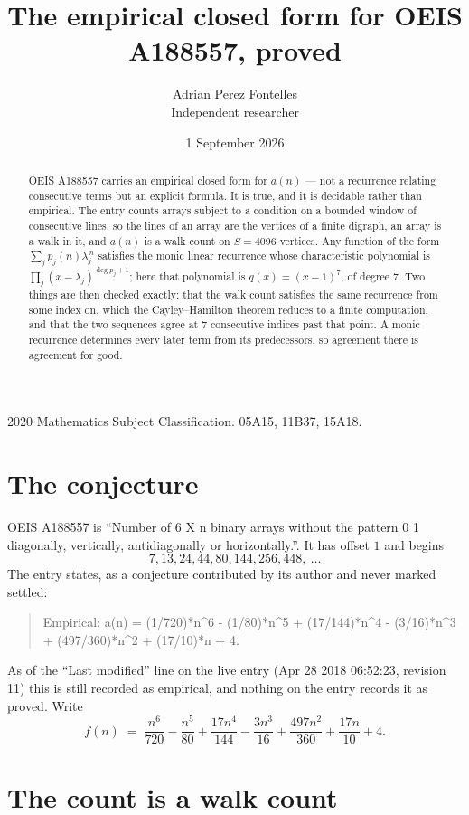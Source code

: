 \documentclass[11pt,a4paper]{article}
\title{The empirical closed form for OEIS A188557, proved}
\author{Adrian Perez Fontelles\\ \small Independent researcher}
\date{1 September 2026}
\theoremstyle{plain}
\theoremstyle{definition}
\begin{document}
\maketitle

\begin{abstract}
OEIS A188557 carries an empirical closed form for $a(n)$ --- not a recurrence relating
consecutive terms but an explicit formula. It is true, and it is decidable rather than
empirical. The entry counts arrays subject to a condition on a bounded window of consecutive lines, so the lines of an array are the
vertices of a finite digraph, an array is a walk in it, and $a(n)$ is a walk count on
$S=4096$ vertices. Any function of the form $\sum_j p_j(n)\lambda_j^{\,n}$ satisfies the
monic linear recurrence whose characteristic polynomial is
$\prod_j(x-\lambda_j)^{\deg p_j+1}$; here that polynomial is $q(x)=(x-1)^{7}$, of degree
$7$. Two things are then checked exactly: that the walk count satisfies the same
recurrence from some index on, which the Cayley--Hamilton theorem reduces to a finite
computation, and that the two sequences agree at $7$ consecutive indices past that
point. A monic recurrence determines every later term from its predecessors, so agreement
there is agreement for good.
\end{abstract}

\noindent\small 2020 Mathematics Subject Classification. 05A15, 11B37, 15A18.\normalsize

\section{The conjecture}

OEIS A188557 is ``Number of 6 X n binary arrays without the pattern 0 1 diagonally, vertically, antidiagonally or horizontally.''. It has offset $1$ and begins
\[
7, 13, 24, 44, 80, 144, 256, 448,\ \dots
\]
The entry states, as a conjecture contributed by its author and never marked settled:
\begin{quote}
Empirical: a(n) = (1/720)*n\^{}6 - (1/80)*n\^{}5 + (17/144)*n\^{}4 - (3/16)*n\^{}3 + (497/360)*n\^{}2 + (17/10)*n + 4.
\end{quote}
As of the ``Last modified'' line on the live entry (Apr 28 2018 06:52:23, revision 11) this is still
recorded as empirical, and nothing on the entry records it as proved. Write
\[
f(n)\;=\;\frac{n^{6}}{720} - \frac{n^{5}}{80} + \frac{17 n^{4}}{144} - \frac{3 n^{3}}{16} + \frac{497 n^{2}}{360} + \frac{17 n}{10} + 4.
\]

\section{The count is a walk count}
\end{document}
